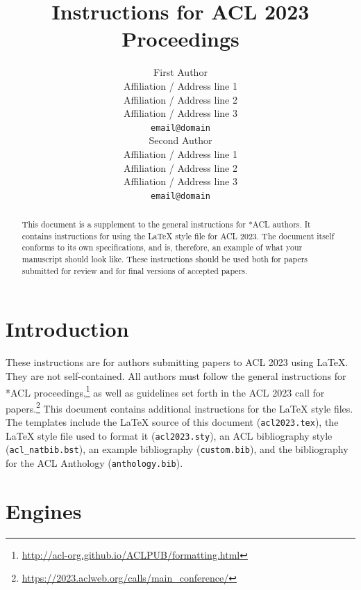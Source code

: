 \documentclass[11pt]{article}
\title{Instructions for ACL 2023 Proceedings}
\author{First Author \\
  Affiliation / Address line 1 \\
  Affiliation / Address line 2 \\
  Affiliation / Address line 3 \\
  \texttt{email@domain} \\\And
  Second Author \\
  Affiliation / Address line 1 \\
  Affiliation / Address line 2 \\
  Affiliation / Address line 3 \\
  \texttt{email@domain} \\}
\begin{document}
\maketitle
\begin{abstract}
This document is a supplement to the general instructions for *ACL authors. It contains instructions for using the \LaTeX{} style file for ACL 2023.
The document itself conforms to its own specifications, and is, therefore, an example of what your manuscript should look like.
These instructions should be used both for papers submitted for review and for final versions of accepted papers.
\end{abstract}

\section{Introduction}

These instructions are for authors submitting papers to ACL 2023 using \LaTeX. They are not self-contained. All authors must follow the general instructions for *ACL proceedings,\footnote{\url{http://acl-org.github.io/ACLPUB/formatting.html}} as well as guidelines set forth in the ACL 2023 call for papers.\footnote{\url{https://2023.aclweb.org/calls/main_conference/}} This document contains additional instructions for the \LaTeX{} style files.
The templates include the \LaTeX{} source of this document (\texttt{acl2023.tex}),
the \LaTeX{} style file used to format it (\texttt{acl2023.sty}),
an ACL bibliography style (\texttt{acl\_natbib.bst}),
an example bibliography (\texttt{custom.bib}),
and the bibliography for the ACL Anthology (\texttt{anthology.bib}).

\section{Engines}
\end{document}
